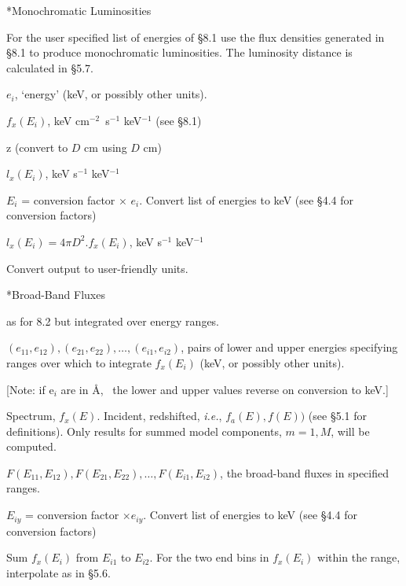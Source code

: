 \**Monochromatic Luminosities

{\list


For the user specified list of energies of \S8.1 use the flux 
densities generated in
\S8.1 to produce monochromatic luminosities.  The luminosity distance is
calculated in \S5.7.


$e_i$, `energy' (keV, or possibly other units).

$f_x(E_i)$, keV cm$^{-2}$~s$^{-1}$ keV$^{-1}$ (see \S 8.1)

z (convert to $D$ cm using %
$D$ cm)


$l_x(E_{i})$,  keV s$^{-1}$ keV$^{-1}$


$E_i$ = conversion factor $\times$ $e_i$.  Convert list of energies to keV (see
\S4.4 for conversion factors)

$l_x(E_{i}) = 4 \pi D^{2}.f_x(E_{i})$, keV s$^{-1}$ keV$^{-1}$

Convert output to user-friendly units.

}
 
\**Broad-Band Fluxes

{\list


as for 8.2 but integrated over energy ranges.


$(e_{11}, e_{12}),(e_{21}, e_{22}),\ldots,(e_{i1}, e_{i2})$,
pairs of lower and upper energies specifying ranges over which to integrate
$f_x(E_i)$ (keV, or possibly other units).

[Note:  if e$_{i}$ are in \AA, ~the lower and upper values reverse on
conversion to keV.]
 
Spectrum, $f_{x}(E)$.  Incident, redshifted,
{\it i.e.}, $f_a(E), f(E))$
(see \S5.1 for definitions).  Only results for summed model components,
$m=1,M$, will be computed. 


$F(E_{11}, E_{12}), F(E_{21}, E_{22}),\ldots,F(E_{i1}, E_{i2})$, the 
broad-band fluxes in specified ranges.


$E_{iy}$ = conversion factor $\times e_{iy}$. Convert list of energies to keV
(see \S4.4 for conversion factors)

Sum $f_x(E_i)$ from $E_{i1}$ to $E_{i2}$.  For the two end bins in
$f_x(E_i)$ within the range, interpolate as in \S5.6.

} 
 

